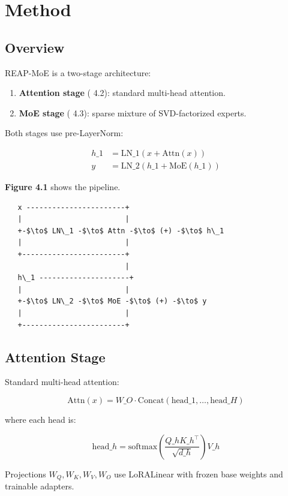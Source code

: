 \section{Method}

\subsection{Overview}

REAP-MoE is a two-stage architecture:

\begin{enumerate}
\item \textbf{Attention stage} ( 4.2): standard multi-head attention.
\item \textbf{MoE stage} ( 4.3): sparse mixture of SVD-factorized experts.

\end{enumerate}
Both stages use pre-LayerNorm:

\[
\begin{aligned}
h\_1 &= \text{LN}\_1(x + \text{Attn}(x)) \\
y &= \text{LN}\_2(h\_1 + \text{MoE}(h\_1))
\end{aligned}
\tag{4.1}
\]

\textbf{Figure 4.1} shows the pipeline.

\begin{lstlisting}
   x -----------------------+
   |                        |
   +-$\to$ LN\_1 -$\to$ Attn -$\to$ (+) -$\to$ h\_1
   |                        |
   +------------------------+
                            |
   h\_1 ---------------------+
   |                        |
   +-$\to$ LN\_2 -$\to$ MoE -$\to$ (+) -$\to$ y
   |                        |
   +------------------------+
\end{lstlisting}

\subsection{Attention Stage}

Standard multi-head attention:

\[
\text{Attn}(x) = W\_O \cdot \text{Concat}(\text{head}\_1, \dots, \text{head}\_H)
\tag{4.2}
\]

where each head is:

\[
\text{head}\_h = \text{softmax}\!\left(\frac{Q\_h K\_h^\top}{\sqrt{d\_h}}\right) V\_h
\tag{4.3}
\]

Projections $W_Q, W_K, W_V, W_O$ use LoRALinear with frozen base weights 
and trainable adapters.

